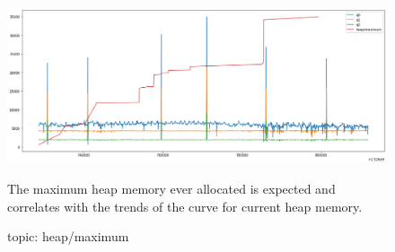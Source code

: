 \documentclass[12pt, letterpaper]{article}
\begin{document}
\begin{figure}
	\setlength{\tabcolsep}{0pt}
	\caption{topic: heap/maximum}
	\label{f:valid_cnt_heap_maximum}
	\begin{center}
		\includegraphics[width=\textwidth]{valid_cnt/valid_cnt-heap_maximum}
	\end{center}
	The maximum heap memory ever allocated is expected and correlates with the trends of the curve for current heap memory.
\end{figure}
\end{document}
